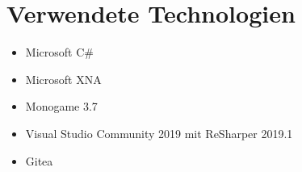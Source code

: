 \section{Verwendete Technologien}



\begin{itemize}[leftmargin=*, nosep]
    \item Microsoft C\#
    \item Microsoft XNA
    \item Monogame 3.7
    \item Visual Studio Community 2019 mit ReSharper 2019.1
    \item Gitea
\end{itemize}
